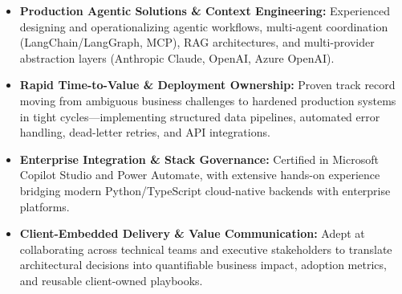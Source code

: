 \documentclass[]{cover}
\begin{document}


\currentdate{\today}



{\raggedright\fontsize{10.5pt}{13pt}\selectfont
\begin{itemize}
    \item \textbf{Production Agentic Solutions \& Context Engineering:} Experienced designing and operationalizing agentic workflows, multi-agent coordination (LangChain/LangGraph, MCP), RAG architectures, and multi-provider abstraction layers (Anthropic Claude, OpenAI, Azure OpenAI).
    \item \textbf{Rapid Time-to-Value \& Deployment Ownership:} Proven track record moving from ambiguous business challenges to hardened production systems in tight cycles—implementing structured data pipelines, automated error handling, dead-letter retries, and API integrations.
    \item \textbf{Enterprise Integration \& Stack Governance:} Certified in Microsoft Copilot Studio and Power Automate, with extensive hands-on experience bridging modern Python/TypeScript cloud-native backends with enterprise platforms.
    \item \textbf{Client-Embedded Delivery \& Value Communication:} Adept at collaborating across technical teams and executive stakeholders to translate architectural decisions into quantifiable business impact, adoption metrics, and reusable client-owned playbooks.
\end{itemize}\par}
\vspace{4pt}
\end{document}
